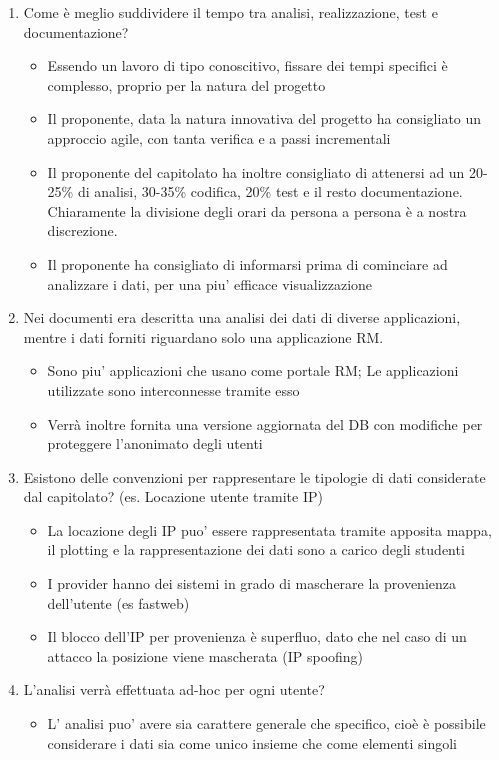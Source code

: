 \begin{enumerate}
	\item Come è meglio suddividere il tempo tra analisi, realizzazione, test e documentazione?
	\begin{itemize}
		\item Essendo un lavoro di tipo conoscitivo, fissare dei tempi specifici è complesso, proprio per la natura del progetto
		\item Il proponente, data la natura innovativa del progetto ha consigliato un approccio agile, con tanta verifica e a passi incrementali
		\item Il proponente del capitolato ha inoltre consigliato di attenersi ad un 20-25\% di analisi, 30-35\% codifica, 20\% test e il resto documentazione. Chiaramente la divisione degli orari da persona a persona è a nostra discrezione.
		\item Il proponente ha consigliato di informarsi prima di cominciare ad analizzare i dati, per una piu' efficace visualizzazione
	\end{itemize}

	\item Nei documenti era descritta una analisi dei dati di diverse applicazioni, mentre i dati forniti riguardano solo una applicazione RM.
	\begin{itemize}
		\item Sono piu' applicazioni che usano come portale RM; Le applicazioni utilizzate sono interconnesse tramite esso
		\item Verrà inoltre fornita una versione aggiornata del DB con modifiche per proteggere l'anonimato degli utenti
	\end{itemize}

	\item Esistono delle convenzioni per rappresentare le tipologie di dati considerate dal capitolato? (es. Locazione utente tramite IP)
	\begin{itemize}
		\item La locazione degli IP puo' essere rappresentata tramite apposita mappa, il plotting e la rappresentazione dei dati sono a carico degli studenti
		\item I provider hanno dei sistemi in grado di mascherare la provenienza dell'utente (es fastweb)
		\item Il blocco dell'IP per provenienza è superfluo, dato che nel caso di un attacco la posizione viene mascherata (IP spoofing)
	\end{itemize}

	\item L'analisi verrà effettuata ad-hoc per ogni utente?
	\begin{itemize}
		\item L' analisi puo' avere sia carattere generale che specifico, cioè è possibile considerare i dati sia come unico insieme che come elementi singoli
	\end{itemize}
\end{enumerate}

